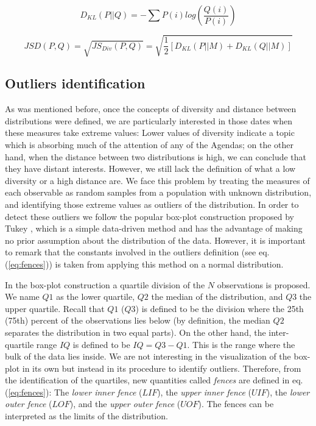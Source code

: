\documentclass{bmcart}
\begin{document}
\begin{equation}
D_{KL}(P||Q) = -\sum{P(i) log(\frac{Q(i)}{P(i)})}
\label{eq:kl}
\end{equation}

\begin{equation}
\label{eq:jensen_shannon_distance}
JSD(P,Q) = \sqrt{JS_{Div}(P,Q)} = \sqrt{\frac{1}{2}[D_{KL}(P||M) + D_{KL}(Q||M)]} 
\label{eq:jensen_shannon_distance}
\end{equation}

\subsection*{Outliers identification}

\par As was mentioned before, once the concepts of diversity and distance between distributions were defined, we are particularly interested in those dates when these measures take extreme values: Lower values of diversity indicate a topic which is absorbing much of the attention of any of the Agendas; on the other hand, when the distance between two distributions is high, we can conclude that they have distant interests.
However, we still lack the definition of what a low diversity or a high distance are. 
We face this problem by treating the measures of each observable as random samples from a population with unknown distribution, and identifying those extreme values as outliers of the distribution. 
In order to detect these outliers we follow the popular box-plot construction proposed by Tukey \cite{tukey1977exploratory}, which is a simple data-driven method and has the advantage of making no prior assumption about the distribution of the data. 
However, it is important to remark that the constants involved in the outliers definition (see eq.(\ref{eq:fences})) is taken from applying this method on a normal distribution.
\par In the box-plot construction a quartile division of the $N$ observations is proposed. We name $Q1$ as the lower quartile, $Q2$ the median of the distribution, and $Q3$ the upper quartile. Recall that $Q1$ ($Q3$) is defined to be the division where the 25th (75th) percent of the observations lies below (by definition, the median $Q2$ separates the distribution in two equal parts). On the other hand, the inter-quartile range $IQ$ is defined to be $IQ = Q3 - Q1$. This is the range where the bulk of the data lies inside.
We are not interesting in the visualization of the box-plot in its own but instead in its procedure to identify outliers. Therefore, from the identification of the quartiles, new quantities called \emph{fences} are defined in eq.(\ref{eq:fences}): The \emph{lower inner fence} ($LIF$), the \emph{upper inner fence} ($UIF$), the \emph{lower outer fence} ($LOF$), and the \emph{upper outer fence} ($UOF$). The fences can be interpreted as the limits of the distribution.
\end{document}
